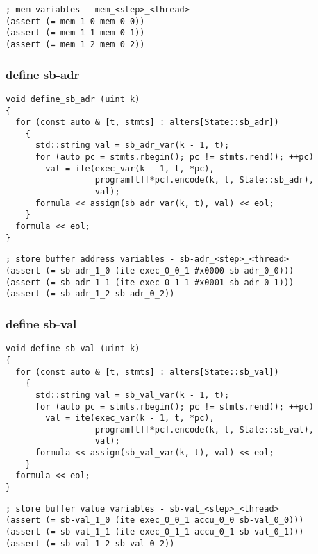 \begin{lstlisting}[language=SMTLib]
; mem variables - mem_<step>_<thread>
(assert (= mem_1_0 mem_0_0))
(assert (= mem_1_1 mem_0_1))
(assert (= mem_1_2 mem_0_2))
\end{lstlisting}

\subsubsection{define sb-adr}

\begin{lstlisting}[style=c++]
void define_sb_adr (uint k)
{
  for (const auto & [t, stmts] : alters[State::sb_adr])
    {
      std::string val = sb_adr_var(k - 1, t);
      for (auto pc = stmts.rbegin(); pc != stmts.rend(); ++pc)
        val = ite(exec_var(k - 1, t, *pc),
                  program[t][*pc].encode(k, t, State::sb_adr),
                  val);
      formula << assign(sb_adr_var(k, t), val) << eol;
    }
  formula << eol;
}
\end{lstlisting}

\begin{lstlisting}[language=SMTLib]
; store buffer address variables - sb-adr_<step>_<thread>
(assert (= sb-adr_1_0 (ite exec_0_0_1 #x0000 sb-adr_0_0)))
(assert (= sb-adr_1_1 (ite exec_0_1_1 #x0001 sb-adr_0_1)))
(assert (= sb-adr_1_2 sb-adr_0_2))
\end{lstlisting}

\subsubsection{define sb-val}

\begin{lstlisting}[style=c++]
void define_sb_val (uint k)
{
  for (const auto & [t, stmts] : alters[State::sb_val])
    {
      std::string val = sb_val_var(k - 1, t);
      for (auto pc = stmts.rbegin(); pc != stmts.rend(); ++pc)
        val = ite(exec_var(k - 1, t, *pc),
                  program[t][*pc].encode(k, t, State::sb_val),
                  val);
      formula << assign(sb_val_var(k, t), val) << eol;
    }
  formula << eol;
}
\end{lstlisting}

\begin{lstlisting}[language=SMTLib]
; store buffer value variables - sb-val_<step>_<thread>
(assert (= sb-val_1_0 (ite exec_0_0_1 accu_0_0 sb-val_0_0)))
(assert (= sb-val_1_1 (ite exec_0_1_1 accu_0_1 sb-val_0_1)))
(assert (= sb-val_1_2 sb-val_0_2))
\end{lstlisting}

